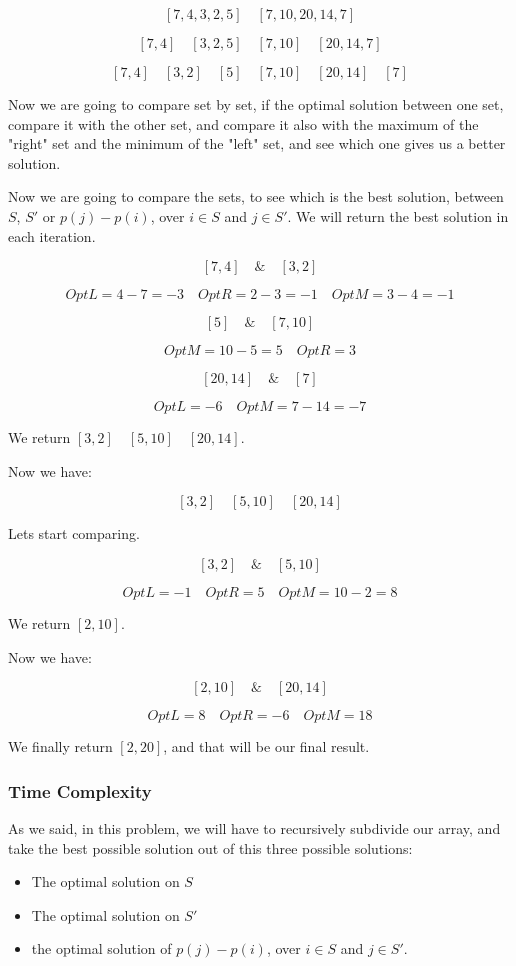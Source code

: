 \documentclass{article}
\begin{document}
$$[7,4,3,2,5] \quad [7,10,20,14,7]$$

$$[7,4] \quad [3,2,5] \quad [7,10] \quad [20,14,7]$$

$$[7,4] \quad [3,2] \quad [5] \quad [7,10] \quad [20,14] \quad [7]$$

Now we are going to compare set by set, if the optimal solution between one set, compare it with the other set, and compare it also with the maximum of the "right" set and the minimum of the "left" set, and see which one gives us a better solution.

Now we are going to compare the sets, to see which is the best solution, between $S$, $S'$ or $p(j)-p(i)$, over $i \in S$ and $j \in S'$. We will return the best solution in each iteration.

$$[7,4] \quad \& \quad [3,2]$$

$$OptL = 4-7 = -3 \quad OptR = 2-3 = -1 \quad OptM = 3-4 = -1$$

$$[5] \quad \& \quad [7,10]$$

$$OptM = 10-5 = 5 \quad OptR = 3$$

$$[20,14] \quad  \& \quad [7]$$

$$OptL = -6 \quad OptM = 7-14 = -7$$

We return $[3,2] \quad [5,10] \quad [20,14]$.

Now we have:

$$[3,2] \quad [5,10] \quad [20,14]$$

Lets start comparing.

$$[3,2] \quad \& \quad [5,10]$$

$$OptL = -1 \quad OptR = 5 \quad OptM = 10 - 2 = 8$$

We return $[2,10]$.

Now we have:

$$[2,10] \quad \& \quad [20,14]$$

$$OptL = 8 \quad OptR = -6 \quad OptM = 18$$

We finally return $[2,20]$, and that will be our final result.

\subsubsection*{Time Complexity}

As we said, in this problem, we will have to recursively subdivide our array, and take the best possible solution out of this three possible solutions:

\begin{itemize}
 \item The optimal solution on $S$
 \item The optimal solution on $S'$
 \item the optimal solution of $p(j)-p(i)$, over $i \in S$ and $j \in S'$.
\end{itemize}
\end{document}
